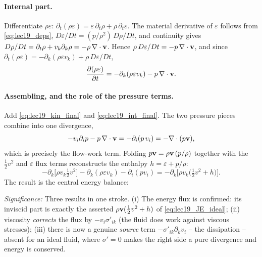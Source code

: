 \documentclass[../main.tex]{subfiles}
\begin{document}
\paragraph{Internal part.} Differentiate $\rho\varepsilon$: $\partial_t(\rho\varepsilon)=\varepsilon\,\partial_t\rho+\rho\,\partial_t\varepsilon$. The material derivative of $\varepsilon$ follows from \eqref{eq:lec19_deps}, $D\varepsilon/Dt=(p/\rho^2)\,D\rho/Dt$, and continuity gives $D\rho/Dt=\partial_t\rho+v_k\partial_k\rho=-\rho\,\nabla \cdot\mathbf{v}$. Hence $\rho\,D\varepsilon/Dt=-p\,\nabla \cdot\mathbf{v}$, and since $\partial_t(\rho\varepsilon)=-\partial_k(\rho\varepsilon v_k)+\rho\,D\varepsilon/Dt$,
\begin{equation}
  \pdv{(\rho\varepsilon)}{t} = -\partial_k(\rho\varepsilon v_k) - p\,\nabla \cdot\mathbf{v} .
  \label{eq:lec19_int_final}
\end{equation}

\paragraph{Assembling, and the role of the pressure terms.} Add \eqref{eq:lec19_kin_final} and \eqref{eq:lec19_int_final}. The two pressure pieces combine into one divergence,
\begin{equation}
  - v_i\partial_i p - p\,\nabla \cdot\mathbf{v} = -\partial_i(p\,v_i) = -\nabla \cdot(p\mathbf{v}),
  \label{eq:lec19_pressure_combine}
\end{equation}
which is precisely the flow-work term. Folding $p\mathbf{v}=\rho\mathbf{v}\,(p/\rho)$ together with the $\tfrac12 v^2$ and $\varepsilon$ flux terms reconstructs the enthalpy $h=\varepsilon+p/\rho$:
\begin{equation}
  -\partial_k\Big[\rho v_k\tfrac12 v^2\Big] - \partial_k(\rho\varepsilon v_k) - \partial_i(pv_i)
    = -\partial_k\Big[\rho v_k\Big(\tfrac12 v^2 + h\Big)\Big].
  \label{eq:lec19_enthalpy_recon}
\end{equation}
The result is the central energy balance:

\textit{Significance:} Three results in one stroke. (i) The energy flux is confirmed: its inviscid part is exactly the asserted $\rho\mathbf{v}(\tfrac12 v^2+h)$ of \eqref{eq:lec19_JE_ideal}; (ii) viscosity \emph{corrects} the flux by $-v_i\sigma'_{ik}$ (the fluid does work against viscous stresses); (iii) there is now a genuine \emph{source} term $-\sigma'_{ik}\partial_k v_i$ -- the dissipation -- absent for an ideal fluid, where $\sigma'=0$ makes the right side a pure divergence and energy is conserved.
\end{document}
